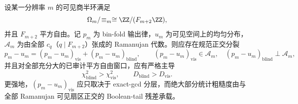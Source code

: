 \begin{conjecture}\label{conj:conclusion-window6-output-ramanujan-visible-blind-dominance}
设某一分辨率 \(m\) 的可见商半环满足
\[
\Omega_m/\!\equiv_m \cong \ZZ/(F_{m+2}\ZZ),
\]
并且 \(F_{m+2}\) 平方自由。记 \(p_m\) 为 bin-fold 输出律，\(u_m\) 为可见空间上的均匀分布，\(\mathcal A_m\) 为由全部 \(c_q\)（\(q\mid F_{m+2}\)）张成的 Ramanujan 代数。则应存在规范正交分裂
\[
p_m-u_m=(p_m-u_m)_{\mathrm{vis}}+(p_m-u_m)_{\mathrm{blind}},
\qquad
(p_m-u_m)_{\mathrm{vis}}\in \mathcal A_m,
\quad
(p_m-u_m)_{\mathrm{blind}}\perp \mathcal A_m,
\]
并且对全部充分大的已审计平方自由窗口，应有严格主导
\[
\chi^2_{\mathrm{blind}}>\chi^2_{\mathrm{vis}},
\qquad
D_{\mathrm{blind}}>D_{\mathrm{vis}}.
\]
更强地，\((p_m-u_m)_{\mathrm{vis}}\) 应只取决于 exact-gcd 分层，而绝大部分统计粗糙度由与全部 Ramanujan 可见扇区正交的 Boolean-tail 残差承载。
\end{conjecture}
